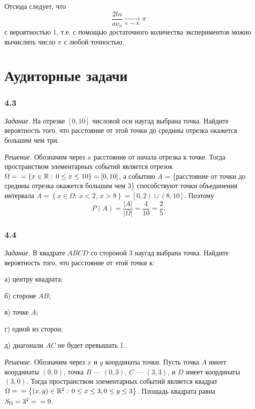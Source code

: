 \documentclass{book}
\begin{document}
Отсюда следует, что
$$ \frac{2l n}{a \nu_n} \xrightarrow[n \rightarrow \infty ]{} \pi $$
с вероятностью 1, т.е. с помощью достаточного количества экспериментов можно вычислить число $ \pi $ с любой точностью.

\section*{Аудиторные задачи}

\subsubsection*{4.3}

\textit{Задание.} На отрезке $ \left[ 0, 10 \right] $ числовой оси наугад выбрана точка.
Найдите вероятность того, что расстояние от этой точки до средины отрезка окажется большим чем три.

\textit{Решение.} Обозначим через $x$ расстояние от начала отрезка к точке.
Тогда пространством элементарных событий является отрезок
$ \Omega = \\
= \left\{ x \in \mathbb{R}: \, 0 \leq x \leq 10 \right\} =
\left[ 0, 10 \right] $,
а событию $A$ =
\{расстояние от точки до средины отрезка окажется большим чем 3\}
способствуют точки объединения интервала
$A =
\left\{ x \in \Omega: \, x < 2, \, x > 8 \right\} =
\left[0, 2 \right) \cup \left(8, 10 \right] $.
Поэтому
$$P \left( A \right) =
\frac{|A|}{| \Omega |} =
\frac{4}{10} =
\frac{2}{5}.$$

\subsubsection*{4.4}

\textit{Задание.} В квадрате $ABCD$ со стороной 3 наугад выбрана точка.
Найдите вероятность того, что расстояние от этой точки к:

а) центру квадрата;

б) стороне $AB$;

в) точке $A$;

г) одной из сторон;

д) диагонали $AC$ не будет превышать 1.

\textit{Решение.} Обозначим через $x$ и $y$ координаты точки.
Пусть точка $A$ имеет координаты $ \left( 0, 0 \right) $,
точка $B$ --- $ \left( 0, 3 \right) $, $C$ --- $ \left( 3, 3 \right) $, и $D$ имеет координаты $ \left( 3, 0 \right) $.
Тогда пространством элементарных событий является квадрат
$ \Omega = \\
=\left\{ \left( x, y \right) \in \mathbb{R}^2: \,
0 \leq x \leq 3,
0 \leq y \leq 3 \right\} $.
Площадь квадрата равна $S_{\Omega} = 3^2 = \\ = 9$.
\end{document}
